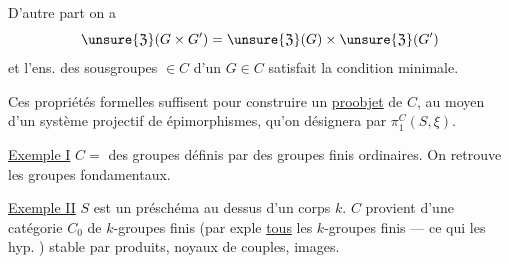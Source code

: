 
D'autre part on a
\[
\unsure{\mathfrak{Z}}(G\times G')=
\unsure{\mathfrak{Z}}(G)\times\unsure{\mathfrak{Z}}(G')
\]
et l'ens. des sousgroupes $\in C$ d'un $G\in C$ satisfait la condition minimale.

Ces propriétés formelles suffisent pour construire un \uline{proobjet} de $C$,
au moyen d'un système projectif de épimorphismes, qu'on
 désignera par $\pi_1^C(S,\xi)$.

\uline{Exemple I} $C=$  des groupes définis par des
groupes finis ordinaires. On retrouve les groupes fondamentaux.

\uline{Exemple II} $S$ est un préschéma au dessus d'un corps $k$.
$C$ provient d'une catégorie $C_0$ de $k$-groupes finis
(par exple \uline{tous} les $k$-groupes finis --- ce qui
  les hyp. )
stable par produits, noyaux de couples, images.
